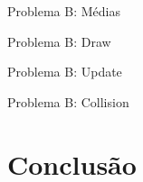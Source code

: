 \documentclass{beamer}
\begin{document}
\begin{frame}[t]{Problema B: Médias}
\end{frame}

\begin{frame}[t]{Problema B: Draw}
\end{frame}

\begin{frame}[t]{Problema B: Update}
\end{frame}

\begin{frame}[t]{Problema B: Collision}
\end{frame}

\section{Conclusão}

\frame{\tableofcontents[currentsection]}
\end{document}

